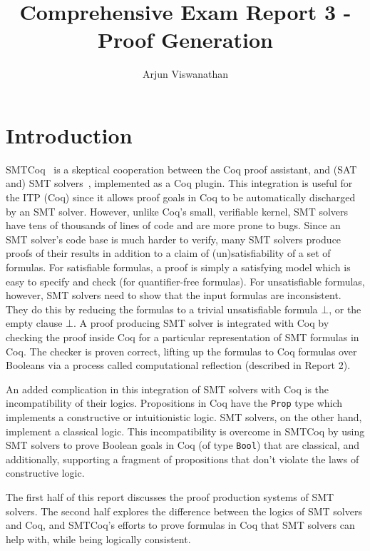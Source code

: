 \documentclass[11pt]{article}
\begin{document}
\title{Comprehensive Exam Report 3 - Proof Generation}
\author{Arjun Viswanathan}
\date{}
\maketitle

\section{Introduction}
\label{sec:intro}
	SMTCoq~\cite{DBLP:phd/hal/Keller13} 
	is a skeptical cooperation 
	between the Coq proof assistant, and 
	(SAT and) SMT solvers~\cite{Barrett2018}, 
	implemented as a 
	Coq plugin. This integration is 
	useful for the ITP (Coq) since it 
	allows proof goals in Coq to be 
	automatically discharged by an 
	SMT solver. However, unlike 
	Coq's small, verifiable kernel,
	SMT solvers have tens of thousands 
	of lines of code and are more prone
	to bugs. Since an SMT solver's code 
	base is much harder to verify, 
	many SMT solvers produce proofs
	of their results in addition to 
	a claim of (un)satisfiability
	of a set of formulas. For satisfiable 
	formulas, a proof is simply a
	satisfying model which is easy 
	to specify and check (for 
	quantifier-free formulas). For 
	unsatisfiable formulas, however,
	SMT solvers need to show that 
	the input formulas are inconsistent.
	They do this by reducing the formulas 
	to a trivial unsatisfiable formula
	$\bot$, or the empty clause 
	$\bot$. A proof 
	producing SMT solver is integrated 
	with Coq by checking the proof 
	inside Coq for a particular 
	representation of SMT formulas in 
	Coq. The checker is proven correct,
	lifting up the formulas
	to Coq formulas over Booleans via a
	process called computational 
	reflection (described in Report 2).
	
	An added complication in this 
	integration of SMT solvers with 
	Coq is the incompatibility of 
	their logics. Propositions in 
	Coq have the 
	\texttt{Prop} type which 
	implements a constructive
	or intuitionistic logic. SMT
	solvers, on the other hand, 
	implement a classical logic. This
	incompatibility is overcome in 
	SMTCoq by using SMT solvers to 
	prove Boolean goals in 
	Coq (of type \texttt{Bool})
	that are classical, and additionally, 
	supporting a fragment of 
	propositions that don't violate 
	the laws of constructive logic.
	
	The first half of this report 
	discusses the proof production 
	systems of SMT solvers. The
	second half explores the difference
	between the logics of SMT solvers
	and Coq, and SMTCoq's efforts 
	to prove formulas in Coq that 
	SMT solvers can help with,
	while being logically consistent.
\end{document}
